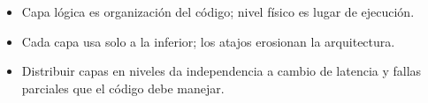 \begin{okBox}[title={Lo esencial de este capítulo}]
	\begin{itemize}
		\item Capa lógica es organización del código; nivel físico es lugar de ejecución.
		\item Cada capa usa solo a la inferior; los atajos erosionan la arquitectura.
		\item Distribuir capas en niveles da independencia a cambio de latencia y fallas parciales que el código debe manejar.
	\end{itemize}
\end{okBox}
